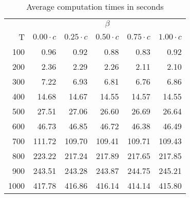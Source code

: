 \documentclass[11pt]{article}
\begin{document}
\begin{table}
\begin{small}
\setlength{\tabcolsep}{4pt}
\caption{Average computation times in seconds} \label{tab2new}
\begin{center}
\begin{tabular}{r|rrrrr}
&\multicolumn{5}{c}{$\beta$}\\
 \cline{2-6}
T & $0.00 \cdot c$&  $0.25\cdot c$ & $0.50\cdot c$ & $0.75\cdot c$& $1.00\cdot c$ \\
\hline 
100 & 0.96 &  0.92 &   0.88 &   0.83 &  0.92 \\ 
200 &  2.36  &   2.29 &  2.26  &  2.11  & 2.10   \\ 
300 &  7.22 &  6.93 &  6.81 &  6.76 &  6.86 \\ 
400 &  14.68 &  14.67 &  14.55 &  14.57 & 14.55  \\ 
500 &  27.51 &  27.06 &  26.60 & 26.69  & 26.64  \\ 
600 &  46.73 &  46.85 &  46.72 &  46.38 &  46.49 \\ \
700 &  111.72 &  109.70 & 109.41  & 109.71  & 109.43  \\ 
800 &  223.22 & 217.24  & 217.89  &  217.65 & 217.85 \\ 
900 &  243.51 &  243.28 &  243.87 &  244.75 &  245.21 \\ 
1000 &  417.78 &  416.86 &  416.14 &  414.14 & 415.80  \\
\end{tabular}
\end{center}
\end{small}
\end{table}
\end{document}
